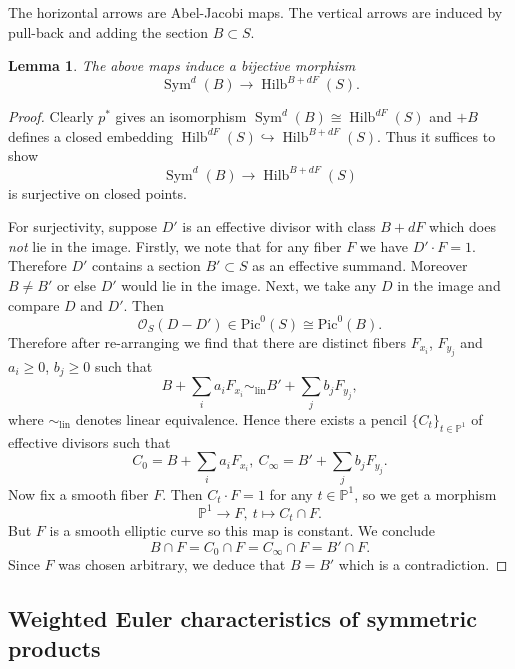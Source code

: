 \documentclass[12pt]{amsart}
\newtheorem{lemma}[theorem]{Lemma}
\theoremstyle{definition}
\newcommand{\PP} {\mathbb{P}}
\renewcommand{\O}{\mathcal{O}}
\newcommand{\Pic}{\mathrm{Pic}}
\newcommand{\Sym}{\operatorname{Sym}}
\newcommand{\Hilb}{\operatorname{Hilb}}
\newcommand{\SubSecSpace}{$\,$\vspace{0.2cm}\par } %
\begin{document}
The horizontal arrows are Abel-Jacobi maps. The vertical arrows are
induced by pull-back and adding the section $B \subset S$.

\begin{lemma} \label{lem: Sym(B) = Hilb(S)}
The above maps induce a bijective morphism
$$
\Sym^d(B) \to  \Hilb^{B+dF}(S).
$$
\end{lemma}

\begin{proof}
Clearly $p^*$ gives an isomorphism $\Sym^d(B) \cong \Hilb^{dF}(S)$ and
$+B$ defines a closed embedding $\Hilb^{dF}(S) \hookrightarrow
\Hilb^{B+dF}(S)$. Thus it suffices
to show
$$
\Sym^d(B) \rightarrow \Hilb^{B+dF}(S)
$$ 
is surjective on closed points.

For surjectivity, suppose $D'$ is an effective divisor with class
$B+dF$ which does \emph{not} lie in the image. Firstly, we note that
for any fiber $F$ we have $D' \cdot F = 1$. Therefore $D'$ contains a
section $B' \subset S$ as an effective summand. Moreover $B \neq B'$
or else $D'$ would lie in the image. Next, we take any $D$ in the
image and compare $D$ and $D'$. Then
$$
\O_S(D-D') \in \Pic^0(S) \cong \Pic^0(B).
$$ 
Therefore after re-arranging we find that there are distinct fibers $F_{x_i}$, $F_{y_j}$ and $a_i \geq 0$, $b_j \geq 0$ such that 
$$
B + \sum_i a_i F_{x_i} \sim_{\mathrm{lin}} B' + \sum_j b_j F_{y_j},
$$
where $\sim_{\mathrm{lin}}$ denotes linear equivalence. Hence there exists a pencil $\{C_t \}_{t \in \PP^1}$ of effective divisors such that
$$
C_0 = B + \sum_i a_i F_{x_i}, \ C_{\infty} = B' + \sum_j b_j F_{y_j}.
$$
Now fix a smooth fiber $F$. Then $C_t \cdot F = 1$ for any $t \in \PP^1$, so we get a morphism
$$
\PP^1 \longrightarrow F, \ t \mapsto C_t \cap F.
$$
But $F$ is a smooth elliptic curve so this map is constant. We conclude
$$
B \cap F = C_0 \cap F = C_{\infty} \cap F = B' \cap F.
$$
Since $F$ was chosen arbitrary, we deduce that $B = B'$ which is a contradiction.
\end{proof}


\subsection{Weighted Euler characteristics of symmetric products} \label{power}\SubSecSpace 
\end{document}
